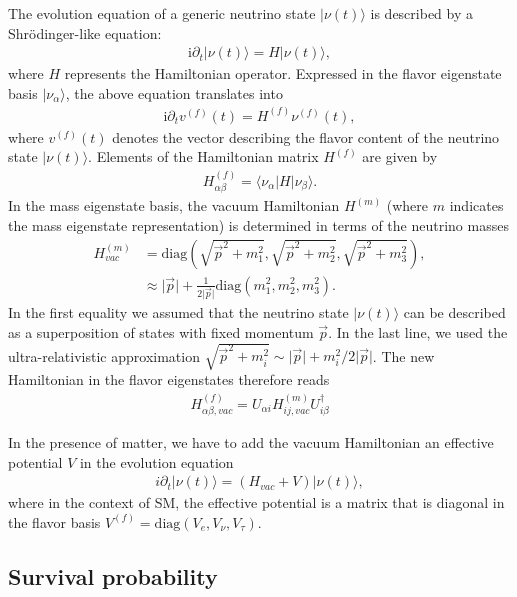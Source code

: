 \documentclass[twocolumn,secnumarabic,amssymb, nobibnotes, aps, prd,10pt]{revtex4-1}
\newcommand{\kt}[1]{\vert #1 \rangle}
\newcommand{\bkt}[3]{\langle #1 \vert #2 \vert #3 \rangle}
\begin{document}
The evolution equation of a generic neutrino state $\kt{\nu(t)}$ is described by a
Shrödinger-like equation:
\begin{align}
\mathrm{i} \partial_t \kt{\nu(t)} = H \kt{\nu(t)},
\end{align}
where $H$ represents the Hamiltonian operator. Expressed in the flavor eigenstate
basis $\kt{\nu_\alpha}$, the above equation translates into
\begin{align}
\mathrm{i} \partial_t v^{(f)}(t) = H^{(f)} \nu^{(f)}(t),
\end{align}
where $v^{(f)}(t)$ denotes the vector describing the flavor content of the neutrino state
$\kt{\nu(t)}$. Elements of the Hamiltonian matrix $H^{(f)}$ are given by
\begin{align}
H^{(f)}_{\alpha \beta} = \bkt{\nu_\alpha}{H}{\nu_\beta}.
\end{align}
In the mass eigenstate basis, the vacuum Hamiltonian $H^{(m)}$ (where $m$ indicates the
mass eigenstate representation) is determined in terms of the neutrino masses
\begin{align}
H^{(m)}_{vac} &= \mathrm{diag} \left( \sqrt{\vec{p}^2 + m_1^2}, \sqrt{\vec{p}^2 + m_2^2},
\sqrt{\vec{p}^2 + m_3^2} \right), \nonumber \\
&\approx \vert \vec{p} \vert + \frac{1}{2 \vert \vec{p} \vert} \mathrm{diag} \left( m_1^2, 
m_2^2, m_3^2 \right).
\end{align}
In the first equality we assumed that the neutrino state $\kt{\nu (t)}$ can be described
as a superposition of states with fixed momentum $\vec{p}$. In the last line, we used the
ultra-relativistic approximation $\sqrt{\vec{p}^2 + m_i^2} \sim \vert \vec{p} \vert + m_i^2
/2 \vert \vec{p} \vert$. The new Hamiltonian in the flavor eigenstates therefore reads
\begin{align}
H^{(f)}_{\alpha \beta, vac} = U_{\alpha i} H^{(m)}_{ij, vac} U^\dagger_{i \beta}
\end{align}

In the presence of matter, we have to add the vacuum Hamiltonian an effective potential
$V$ in the evolution equation
\begin{align}
i \partial_t \kt{\nu (t)} = \left( H_{vac} + V \right) \kt{\nu (t)},
\end{align}
where in the context of SM, the effective potential is a matrix that is diagonal in the
flavor basis $V^{(f)} = \mathrm{diag} \left( V_e, V_\nu, V_\tau \right)$.


\subsection{Survival probability}
\label{subsec:survival}
\end{document}
